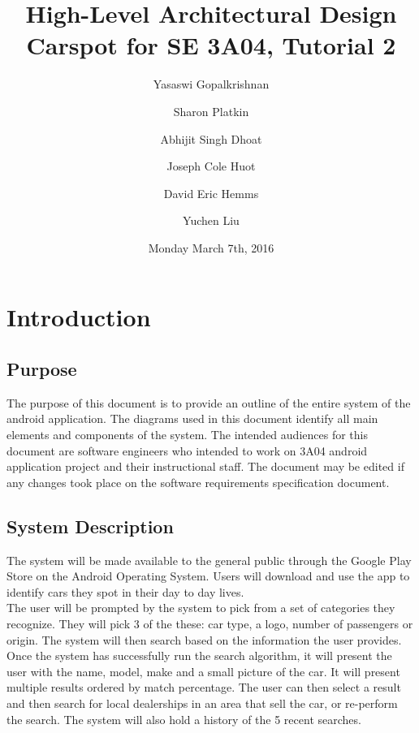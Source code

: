 \documentclass[12pt]{article}
\title{High-Level Architectural Design\\
	\large Carspot for SE 3A04, Tutorial 2}
\author{
         Yasaswi Gopalkrishnan\\ \newline
         \and
         Sharon Platkin \\ \newline
         \and
         Abhijit Singh Dhoat\\ \newline
         \and
         Joseph Cole Huot\\ \newline
         \and
         David Eric Hemms\\ \newline
         \and
         Yuchen Liu\\ \newline
    }
\date{Monday March 7th, 2016}
\begin{document}
\maketitle
\newpage
\tableofcontents
\listoftables
\newpage

\section{Introduction}
\label{sec:introduction}

\subsection{Purpose}
\label{sub:purpose}

The purpose of this document is to provide an outline of the entire system of the android application. The diagrams used in this document identify all main elements and components of the system. The intended audiences for this document are software engineers who intended to work on 3A04 android application project and their instructional staff. The document may be edited if any changes took place on the software requirements specification document.


\subsection{System Description}
\label{sub:system_description}
The system will be made available to the general public through the Google Play Store on the Android Operating System. Users will download and use the app to identify cars they spot in their day to day lives. \\
The user will be prompted by the system to pick from a set of categories they recognize. They will pick 3 of the these: car type, a logo, number of passengers or origin. The system will then search based on the information the user provides. Once the system has successfully run the search algorithm, it will present the user with the name, model, make and a small picture of the car. It will present multiple results ordered by match percentage. The user can then select a result and then search for local dealerships in an area that sell the car, or re-perform the search. The system will also hold a history of the 5 recent searches.
\end{document}
